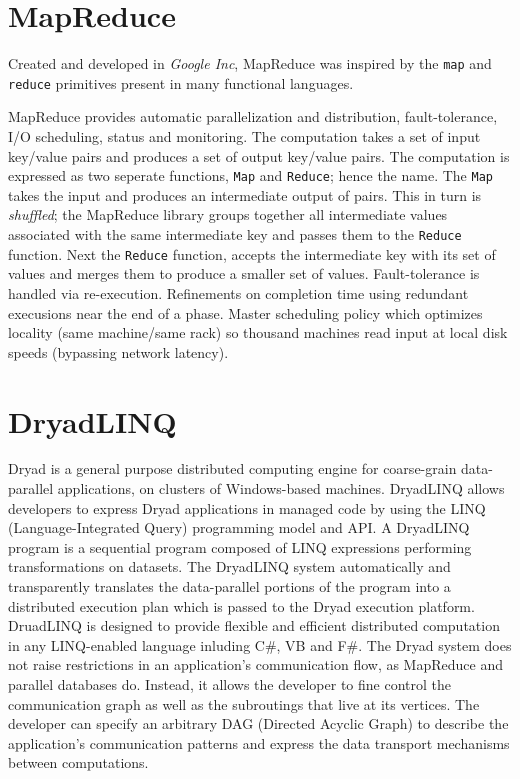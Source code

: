 \documentclass[letterpaper,twocolumn,10pt]{article}
\begin{document}
\section{MapReduce}
Created and developed in \textit{Google Inc}, MapReduce was inspired by the {\tt map} and {\tt reduce} primitives present in many functional languages.

MapReduce provides automatic parallelization and distribution, fault-tolerance, I/O scheduling, status and monitoring. The computation takes a set of input key/value pairs and produces a set of output key/value pairs. The computation is expressed as two seperate functions, {\tt Map} and {\tt Reduce}; hence the name. The {\tt Map} takes the input and produces an intermediate output of pairs. This in turn is \textit{shuffled}; the MapReduce library groups together all intermediate values associated with the same intermediate key and passes them to the {\tt Reduce} function. Next the {\tt Reduce} function, accepts the intermediate key with its set of values and merges them to produce a smaller set of values.
Fault-tolerance is handled via re-execution. Refinements on completion time using redundant execusions near the end of a phase. Master scheduling policy which optimizes locality (same machine/same rack) so thousand machines read input at local disk speeds (bypassing network latency).

\section{DryadLINQ}
Dryad is a general purpose distributed computing engine for coarse-grain data-parallel applications, on clusters of Windows-based machines. DryadLINQ allows developers to express Dryad applications in managed code by using the LINQ (Language-Integrated Query) programming model and API.
A DryadLINQ program is a sequential program composed of LINQ expressions performing transformations on datasets. The DryadLINQ system automatically and transparently translates the data-parallel portions of the program into a distributed execution plan which is passed to the Dryad execution platform. DruadLINQ is designed to provide flexible and efficient distributed computation in any LINQ-enabled language inluding C\#, VB and F\#.
The Dryad system does not raise restrictions in an application's communication flow, as MapReduce and parallel databases do. Instead, it allows the developer to fine control the communication graph as well as the subroutings that live at its vertices. The developer can specify an arbitrary DAG (Directed Acyclic Graph) to describe the application's communication patterns and express the data transport mechanisms between computations.
\end{document}
